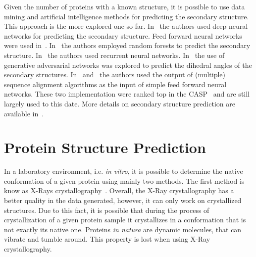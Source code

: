 Given the number of proteins with a known structure, it is possible to use data
mining and artificial intelligence methods for predicting the secondary
structure. This approach is the more explored one so far.
In~\cite{wang2016protein} the authors used deep neural networks for predicting
the secondary structure. Feed forward neural networks were used
in~\cite{meng2016computational}. In~\cite{kathuria2018predicting} the authors
employed random forests to predict the secondary structure.
In~\cite{baldi1999exploiting} the authors used recurrent neural networks.
In~\cite{kim2018dihedral} the use of generative adversarial networks was
explored to predict the dihedral angles of the secondary structures.
In~\cite{pollastri2002improving} and~\cite{mcguffin2000psipred} the authors
used the output of (multiple) sequence alignment algorithms as the input of
simple feed forward neural networks. These two implementation were ranked top
in the \ac{CASP}~\cite{moult1999critical} and are still largely used to this
date. More details on secondary structure prediction are available
in~\cite{jiang2017protein}.


\section{Protein Structure Prediction}
\label{sec:psp}
\label{sec:pspp}
\label{sec:protein-structure}




In a laboratory environment, i.e. \textit{in vitro}, it is possible to
determine the native conformation of a given protein using mainly two methods.
The first method is know as X-Rays crystallography~\cite{nelson2008lehninger}.
Overall, the X-Ray crystallography has a better quality in the data generated,
however, it can only work on crystallized structures. Due to this fact, it is
possible that during the process of crystallization of a given protein sample
it crystallizes in a conformation that is not exactly its native one. Proteins
\textit{in natura} are dynamic molecules, that can vibrate and tumble around.
This property is lost when using X-Ray crystallography.

